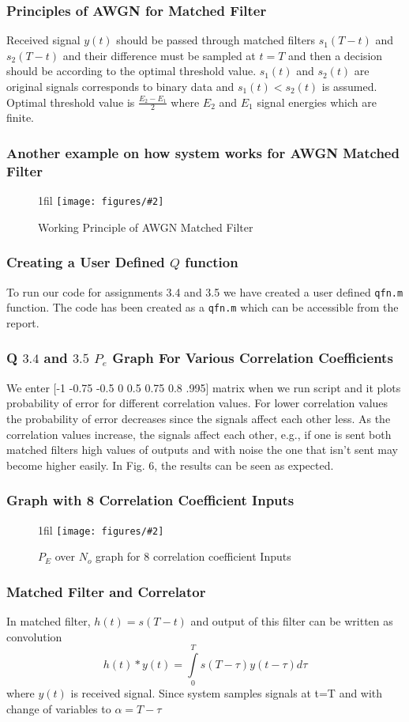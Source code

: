 \documentclass{beamer}
\makeatletter
\newcommand{\code}[1]{\texttt{#1}}
\newcommand*{\centerfloat}{%
  \parindent \z@
  \leftskip \z@ \@plus 1fil \@minus \textwidth
  \rightskip\leftskip
  \parfillskip \z@skip}
\newcommand{\fig}[3]{
  \begin{figure}[H]
  \centerfloat
    \texttt{[image: figures/\#2]}
    \caption{#3}
  \end{figure}
}
\makeatother
\begin{document}
\begin{frame}
	\frametitle{Principles of AWGN for Matched Filter}
Received signal $y(t)$ should be passed through matched filters $s_1(T-t)$ and $s_2(T-t)$ and their difference must be sampled at $t=T$ and then a decision should be according to the optimal threshold value. $s_1(t)$ and $s_2(t)$ are original signals corresponds to binary data and $s_1(t)<s_2(t)$ is assumed. Optimal threshold value is $\frac{E_2-E_1}{2}$ where $E_2$ and $E_1$ signal energies which are finite.
\end{frame}

\begin{frame}
	\frametitle{Another example on how system works for AWGN Matched Filter}
	\fig{5cm}{working_principle_mf.png} {Working Principle of AWGN Matched Filter}
\end{frame}

\begin{frame}
	\frametitle{Creating a User Defined $Q$ function}
To run our code for assignments 3.4 and 3.5 we have created a user defined \code{qfn.m} function. The code has been created as a \code{qfn.m} which can be accessible from the report.
\end{frame}

\begin{frame}
	\frametitle{Q $3.4$ and $3.5$ $P_e$ Graph For Various Correlation Coefficients}
We enter [-1 -0.75 -0.5 0 0.5 0.75 0.8 .995] matrix when we run script and it plots probability of error for different correlation values. For lower correlation values the probability of error decreases since the signals affect each other less. As the correlation values increase, the signals affect each other, e.g., if one is sent both matched filters high values of outputs and with noise the one that isn't sent may become higher easily. In Fig. 6, the results can be seen as expected.
\end{frame}

\begin{frame}
	\frametitle{Graph with 8 Correlation Coefficient Inputs}
	\fig{5cm}{question351.png}{$P_E $ over $N_o$ graph for 8 correlation coefficient Inputs}
\end{frame}
\begin{frame}
	\frametitle{Matched Filter and Correlator}

In matched filter, $h(t)=s(T-t)$ and output of this filter can be written as convolution
$$h(t)*y(t)=\int\limits^T_0s(T-\tau)y(t-\tau)d\tau$$
where $y(t)$ is received signal. Since system samples signals at t=T and with change of variables to $\alpha=T-\tau$
\end{frame} 
\end{document}
